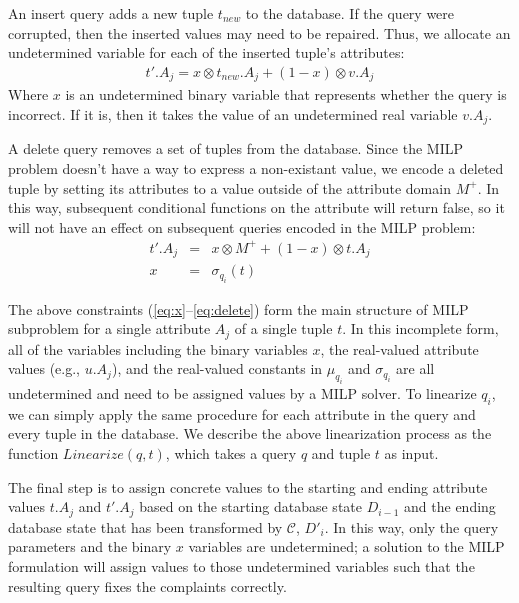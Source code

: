 An insert query adds a new tuple $t_{new}$ to the database.  If the query were 
corrupted, then the inserted values may need to be repaired.  Thus, we allocate
an undetermined variable for each of the inserted tuple's attributes:
{\scriptsize
\begin{eqnarray}
\label{eq:insert}
t'.A_j = x \otimes t_{new}.A_j + (1-x) \otimes v.A_j 
\end{eqnarray}
}
\noindent Where $x$ is an undetermined binary variable that represents whether
the query is incorrect.  If it is, then it takes the value of an undetermined real 
variable $v.A_j$.


A delete query removes a set of tuples from the database.  
Since the MILP problem doesn't have a way to express a non-existant value, 
we encode a deleted tuple by setting its attributes to a value
outside of the attribute domain $M^+$.  In this way, subsequent conditional functions
on the attribute will return false, so it will not have an effect on subsequent queries encoded
in the MILP problem:
{\scriptsize
\begin{eqnarray}
\label{eq:delete}
t'.A_j &=& x \otimes M^+ + (1-x) \otimes t.A_j \nonumber \\
x &=& \sigma_{q_i}(t)
\end{eqnarray}
}



The above constraints (\ref{eq:x}--\ref{eq:delete})
form the main structure of MILP subproblem for a single attribute $A_j$ of a single tuple $t$.
In this incomplete form, all of the variables including the binary variables $x$,
the real-valued attribute values (e.g., $u.A_j$),
and the real-valued constants in $\mu_{q_i}$ and $\sigma_{q_i}$ are all undetermined
and need to be assigned values by a MILP solver.  
To linearize $q_i$, we can simply apply the same procedure for each attribute in the 
query and every tuple in the database.
We describe the above linearization process as the function 
$Linearize(q, t)$, which takes a query $q$ and tuple $t$ as input.

The final step is to assign concrete values to the starting and ending attribute values 
$t.A_j$ and $t'.A_j$ based on the starting database state $D_{i-1}$ and the ending database 
state that has been transformed by $\mathcal{C}$, $D'_i$.
In this way, only the query parameters and the binary $x$ variables are undetermined;
a solution to the MILP formulation will assign values to those undetermined variables
such that the resulting query fixes the complaints correctly.

